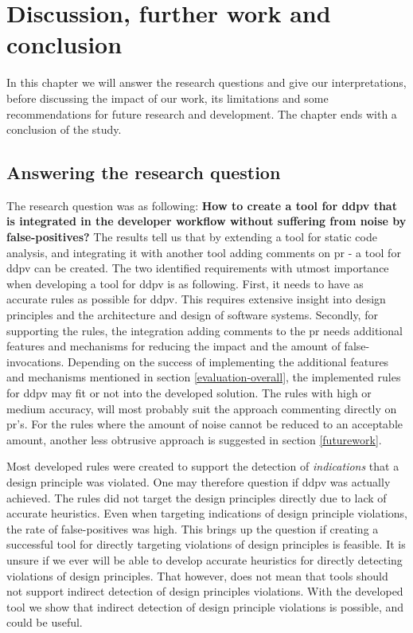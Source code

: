 \documentclass[pdftex,10pt,b5paper,twoside]{report}
\begin{document}
\cleardoublepage
\chapter{Discussion, further work and conclusion}
\label{discussion}
In this chapter we will answer the research questions and give our interpretations, before discussing the impact of our work, its limitations and some recommendations for future research and development. The chapter ends with a conclusion of the study.

\section{Answering the research question}

The research question was as following: \textbf{How to create a tool for \gls{ddpv} that is integrated in the developer workflow without suffering from noise by false-positives?}
The results tell us that by extending a tool for static code analysis, and integrating it with another tool adding comments on \gls{pr} - a tool for \gls{ddpv} can be created. The two identified requirements with utmost importance when developing a tool for \gls{ddpv} is as following. First, it needs to have as accurate rules as possible for \gls{ddpv}. This requires extensive insight into design principles and the architecture and design of software systems. Secondly, for supporting the rules, the integration adding comments to the \gls{pr} needs additional features and mechanisms for reducing the impact and the amount of false-invocations. Depending on the success of implementing the additional features and mechanisms mentioned in section \ref{evaluation-overall}, the implemented rules for \gls{ddpv} may fit or not into the developed solution. The rules with high or medium accuracy, will most probably suit the approach commenting directly on \gls{pr}'s. For the rules where the amount of noise cannot be reduced to an acceptable amount, another less obtrusive approach is suggested in section \ref{futurework}.

Most developed rules were created to support the detection of \textit{indications} that a design principle was violated. One may therefore question if \gls{ddpv} was actually achieved. The rules did not target the design principles directly due to lack of accurate heuristics. Even when targeting indications of design principle violations, the rate of false-positives was high. This brings up the question if creating a successful tool for directly targeting violations of design principles is feasible. It is unsure if we ever will be able to develop accurate heuristics for directly detecting violations of design principles. That however, does not mean that tools should not support indirect detection of design principles violations. With the developed tool we show that indirect detection of design principle violations is possible, and could be useful. 
\end{document}
